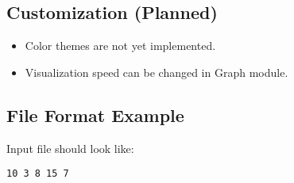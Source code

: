 \vspace{1em}
  


\subsection{Customization (Planned)}
\begin{itemize}
    \item Color themes are not yet implemented.
\end{itemize}
\begin{itemize}
    \item Visualization speed can be changed in Graph module.
\end{itemize}

\subsection{File Format Example}
Input file should look like:
\begin{verbatim}
10 3 8 15 7
\end{verbatim}
